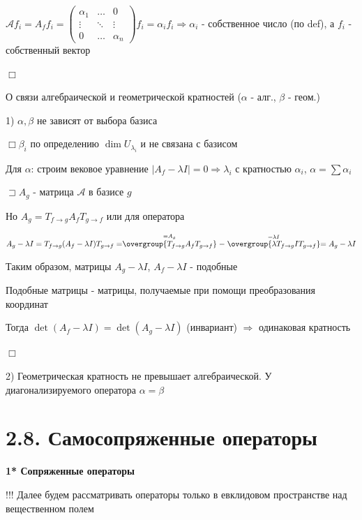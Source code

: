 \documentclass[12pt]{article}
\begin{document}
    $\mathcal{A}f_i = A_f f_i = \begin{pmatrix}
                                    \alpha_1 & \dots  & 0        \\
                                    \vdots   & \ddots & \vdots   \\
                                    0        & \dots  & \alpha_n
    \end{pmatrix} f_i = \alpha_i f_i \Longrightarrow \alpha_i$ - собственное число (по def), а $f_i$ - собственный вектор

    $\Box$

    \Nota О связи алгебраической и геометрической кратностей ($\alpha$ - алг., $\beta$ - геом.)

    1) $\alpha, \beta$ не зависят от выбора базиса

    $\Box \beta_i$ по определению $\dim U_{\lambda_i}$ и не связана с базисом

    Для $\alpha$: строим вековое уравнение $|A_f - \lambda I| = 0 \Longrightarrow \lambda_i$ с кратностью $\alpha_i$, $\alpha = \sum \alpha_i$

    $\sqsupset A_g$ - матрица $\mathcal{A}$ в базисе $g$

    Но $A_g = T_{f\to g} A_f T_{g\to f}$ или для оператора

    $A_g - \lambda I = T_{f\to g} (A_f - \lambda I) T_{g\to f} =
    \stackrel{= A_g}{\overgroup{T_{f\to g} A_f T_{g\to f}}} - \stackrel{= \lambda I}{\overgroup{\lambda T_{f\to g} I T_{g\to f}}} =
    A_g - \lambda I$

    Таким образом, матрицы $A_g - \lambda I$, $A_f - \lambda I$ - подобные

    \Def Подобные матрицы - матрицы, получаемые при помощи преобразования координат

    Тогда $\det (A_f - \lambda I) = \det (A_g - \lambda I)$ (инвариант) $\Longrightarrow$ одинаковая кратность

    $\Box$

    2) Геометрическая кратность не превышает алгебраической. У диагонализируемого оператора $\alpha = \beta$

    \section{2.8. Самосопряженные операторы}

    \textbf{1* Сопряженные операторы}

    !!! Далее будем рассматривать операторы только в евклидовом пространстве над вещественном полем
\end{document}

